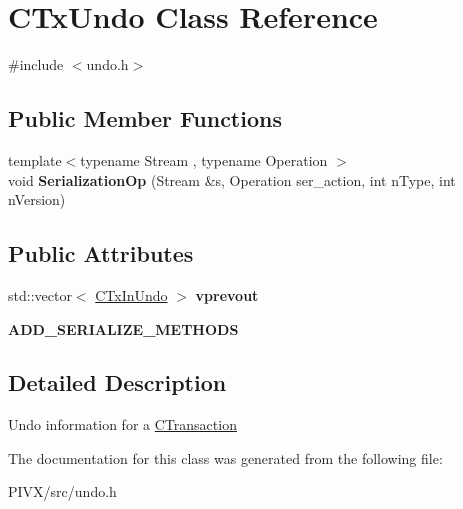 \hypertarget{class_c_tx_undo}{}\section{C\+Tx\+Undo Class Reference}
\label{class_c_tx_undo}


{\ttfamily \#include $<$undo.\+h$>$}

\subsection*{Public Member Functions}
\begin{DoxyCompactItemize}
\item 
\mbox{\label{class_c_tx_undo_acded3ea0adf0309c160ea756a2361bf2}} 
{\footnotesize template$<$typename Stream , typename Operation $>$ }\\void {\bfseries Serialization\+Op} (Stream \&s, Operation ser\+\_\+action, int n\+Type, int n\+Version)
\end{DoxyCompactItemize}
\subsection*{Public Attributes}
\begin{DoxyCompactItemize}
\item 
\mbox{\label{class_c_tx_undo_a035e62f0b46f0d4ba392dad686ed18de}} 
std\+::vector$<$ \mbox{\hyperlink{class_c_tx_in_undo}{C\+Tx\+In\+Undo}} $>$ {\bfseries vprevout}
\item 
\mbox{\label{class_c_tx_undo_a8b7b4f167a00e200723165b3446cc4c4}} 
{\bfseries A\+D\+D\+\_\+\+S\+E\+R\+I\+A\+L\+I\+Z\+E\+\_\+\+M\+E\+T\+H\+O\+DS}
\end{DoxyCompactItemize}


\subsection{Detailed Description}
Undo information for a \mbox{\hyperlink{class_c_transaction}{C\+Transaction}} 

The documentation for this class was generated from the following file\+:\begin{DoxyCompactItemize}
\item 
P\+I\+V\+X/src/undo.\+h\end{DoxyCompactItemize}
